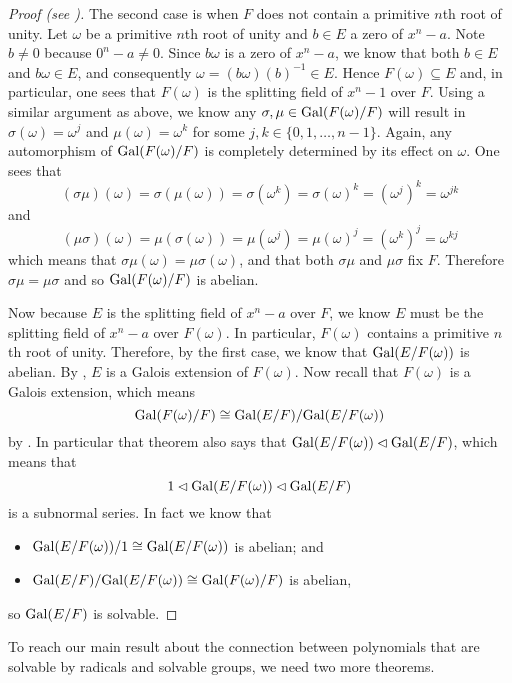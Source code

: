 \begin{proof}[Proof (see {\cite[Theorem 32.2]{gallian_2016}})]
    The second case is when $F$ does not contain a primitive $n$th root of unity. Let $\omega$ be a primitive $n$th root of unity and $b \in E$ a zero of $x^n - a$. Note $b \neq 0$ because $0^n-a \neq 0$. Since $b\omega$ is a zero of $x^n - a$, we know that both $b \in E$ and $b\omega \in E$, and consequently $\omega = (b\omega)(b)^{-1} \in E$. Hence $F(\omega) \subseteq E$ and, in particular, one sees that $F(\omega)$ is the splitting field of $x^n - 1$ over $F$. Using a similar argument as above, we know any $\sigma, \mu \in \mathrm{Gal}(F(\omega)/F)$ will result in $\sigma(\omega) = \omega^j$ and $\mu(\omega) = \omega^k$ for some $j, k \in \{0, 1, \dots, n - 1\}$. Again, any automorphism of $\mathrm{Gal}(F(\omega)/F)$ is completely determined by its effect on $\omega$. One sees that
    \[
        (\sigma\mu)(\omega) = \sigma(\mu(\omega)) = \sigma(\omega^k) = \sigma(\omega)^k = (\omega^j)^k = \omega^{jk}
    \]
    and
    \[
        (\mu\sigma)(\omega) = \mu(\sigma(\omega)) = \mu(\omega^j) = \mu(\omega)^j = (\omega^k)^j = \omega^{kj}
    \]
    which means that $\sigma\mu(\omega) = \mu\sigma(\omega)$, and that both $\sigma\mu$ and $\mu\sigma$ fix $F$. Therefore $\sigma\mu = \mu\sigma$ and so $\mathrm{Gal}(F(\omega)/F)$ is abelian.

    Now because $E$ is the splitting field of $x^n - a$ over $F$, we know $E$ must be the splitting field of $x^n - a$ over $F(\omega)$. In particular, $F(\omega)$ contains a primitive $n$th root of unity. Therefore, by the first case, we know that $\mathrm{Gal}(E/F(\omega))$ is abelian. By , $E$ is a Galois extension of $F(\omega)$. Now recall that $F(\omega)$ is a Galois extension, which means
    \[
        \mathrm{Gal}(F(\omega)/F) \cong \mathrm{Gal}(E/F)/\mathrm{Gal}(E/F(\omega))
    \]
    by . In particular that theorem also says that $\mathrm{Gal}(E/F(\omega)) \lhd \mathrm{Gal}(E/F)$, which means that
    \[
        1 \lhd \mathrm{Gal}(E/F(\omega)) \lhd \mathrm{Gal}(E/F)
    \]
    is a subnormal series. In fact we know that
    \begin{itemize}
        \item $\mathrm{Gal}(E/F(\omega))/1 \cong \mathrm{Gal}(E/F(\omega))$ is abelian; and
        \item $\mathrm{Gal}(E/F)/\mathrm{Gal}(E/F(\omega)) \cong \mathrm{Gal}(F(\omega)/F)$ is abelian,
    \end{itemize}
    so $\mathrm{Gal}(E/F)$ is solvable.
\end{proof}

To reach our main result about the connection between polynomials that are solvable by radicals and solvable groups, we need two more theorems.


